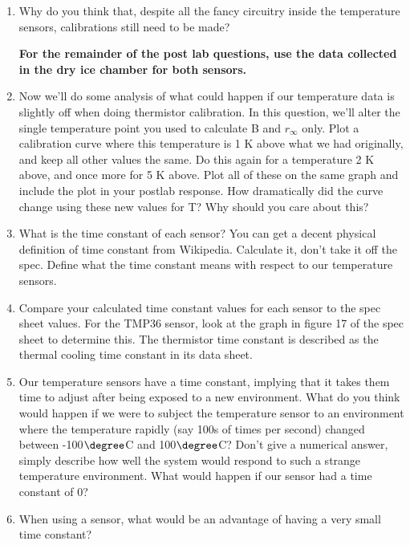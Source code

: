\documentclass[12pt]{article}
\begin{document}
\begin{enumerate}
		\item Why do you think that, despite all the fancy circuitry inside the temperature sensors, calibrations still need to be made?
		
		\textbf{For the remainder of the post lab questions, use the data collected in the dry ice chamber for both sensors.} 
		
		\item Now we'll do some analysis of what could happen if our temperature data is slightly off when doing thermistor calibration. In this question, we'll alter the single temperature point you used to calculate B and $r_{\infty}$ only. Plot a calibration curve where this temperature is 1 K above what we had originally, and keep all other values the same. Do this again for a temperature 2 K above, and once more for 5 K above. Plot all of these on the same graph and include the plot in your postlab response. How dramatically did the curve change using these new values for T? Why should you care about this?
		
		\item What is the time constant of each sensor? You can get a decent physical definition of time constant from Wikipedia. Calculate it, don't take it off the spec. Define what the time constant means with respect to our temperature sensors.
		
		\item Compare your calculated time constant values for each sensor to the spec sheet values. For the TMP36 sensor, look at the graph in figure 17 of the spec sheet to determine this. The thermistor time constant is described as the thermal cooling time constant in its data sheet.
		
		\item Our temperature sensors have a time constant, implying that it takes them time to adjust after being exposed to a new environment. What do you think would happen if we were to subject the temperature sensor to an environment where the temperature rapidly (say 100s of times per second) changed between -100$\degree$C and 100$\degree$C? Don't give a numerical answer, simply describe how well the system would respond to such a strange temperature environment. What would happen if our sensor had a time constant of 0?
		
		\item When using a sensor, what would be an advantage of having a very small time constant?
		
	\end{enumerate}
    
\end{document}
